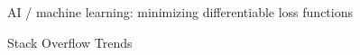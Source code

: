\documentclass[
    xcolor={svgnames,dvipsnames},
    hyperref={colorlinks, citecolor=DeepPink4, linkcolor=DarkRed, urlcolor=DarkBlue}
    ]{beamer}  %
\newcommand{\1}{\mathbbm 1}
\begin{document}
\begin{frame}
    

    AI / machine learning: minimizing differentiable loss functions
    
    \begin{figure}
       \begin{center}
       \end{center}
    \end{figure}


\end{frame}


\begin{frame}

    Stack Overflow Trends

    \begin{figure}
       \begin{center}
       \end{center}
    \end{figure}

\end{frame}
\end{document}
